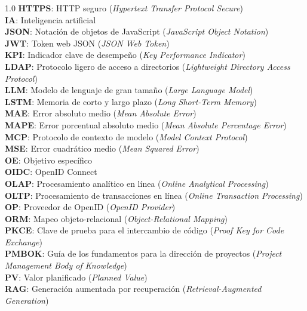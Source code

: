 \documentclass{univalle-perfil}
\begin{document}
\begin{spacing}{1.0}
  \textbf{HTTPS}: HTTP seguro (\textit{Hypertext Transfer Protocol Secure})\\
  \textbf{IA}: Inteligencia artificial\\
  \textbf{JSON}: Notación de objetos de JavaScript (\textit{JavaScript Object Notation})\\
  \textbf{JWT}: Token web JSON (\textit{JSON Web Token})\\
  \textbf{KPI}: Indicador clave de desempeño (\textit{Key Performance Indicator})\\
  \textbf{LDAP}: Protocolo ligero de acceso a directorios (\textit{Lightweight Directory Access Protocol})\\
  \textbf{LLM}: Modelo de lenguaje de gran tamaño (\textit{Large Language Model})\\
  \textbf{LSTM}: Memoria de corto y largo plazo (\textit{Long Short-Term Memory})\\
  \textbf{MAE}: Error absoluto medio (\textit{Mean Absolute Error})\\
  \textbf{MAPE}: Error porcentual absoluto medio (\textit{Mean Absolute Percentage Error})\\
  \textbf{MCP}: Protocolo de contexto de modelo (\textit{Model Context Protocol})\\
  \textbf{MSE}: Error cuadrático medio (\textit{Mean Squared Error})\\
  \textbf{OE}: Objetivo específico\\
  \textbf{OIDC}: OpenID Connect\\
  \textbf{OLAP}: Procesamiento analítico en línea (\textit{Online Analytical Processing})\\
  \textbf{OLTP}: Procesamiento de transacciones en línea (\textit{Online Transaction Processing})\\
  \textbf{OP}: Proveedor de OpenID (\textit{OpenID Provider})\\
  \textbf{ORM}: Mapeo objeto-relacional (\textit{Object-Relational Mapping})\\
  \textbf{PKCE}: Clave de prueba para el intercambio de código (\textit{Proof Key for Code Exchange})\\
  \textbf{PMBOK}: Guía de los fundamentos para la dirección de proyectos (\textit{Project Management Body of Knowledge})\\
  \textbf{PV}: Valor planificado (\textit{Planned Value})\\
  \textbf{RAG}: Generación aumentada por recuperación (\textit{Retrieval-Augmented Generation})\\

\end{spacing}
\end{document}
